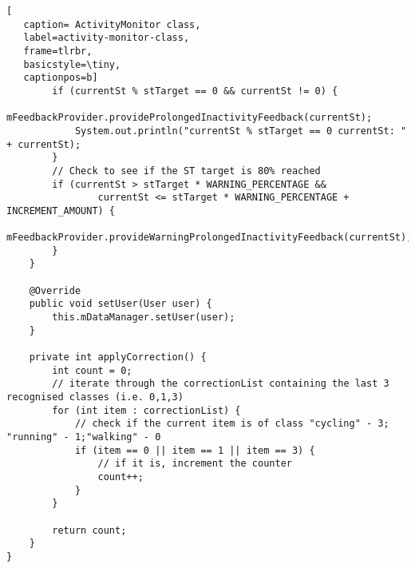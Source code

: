 \begin{lstlisting}[
   caption= ActivityMonitor class,
   label=activity-monitor-class,
   frame=tlrbr,
   basicstyle=\tiny,
   captionpos=b]
        if (currentSt % stTarget == 0 && currentSt != 0) {
            mFeedbackProvider.provideProlongedInactivityFeedback(currentSt);
            System.out.println("currentSt % stTarget == 0 currentSt: " + currentSt);
        }
        // Check to see if the ST target is 80% reached
        if (currentSt > stTarget * WARNING_PERCENTAGE &&
                currentSt <= stTarget * WARNING_PERCENTAGE + INCREMENT_AMOUNT) {
            mFeedbackProvider.provideWarningProlongedInactivityFeedback(currentSt);
        }
    }

    @Override
    public void setUser(User user) {
        this.mDataManager.setUser(user);
    }

    private int applyCorrection() {
        int count = 0;
        // iterate through the correctionList containing the last 3 recognised classes (i.e. 0,1,3)
        for (int item : correctionList) {
            // check if the current item is of class "cycling" - 3; "running" - 1;"walking" - 0
            if (item == 0 || item == 1 || item == 3) {
                // if it is, increment the counter
                count++;
            }
        }

        return count;
    }
}
\end{lstlisting}